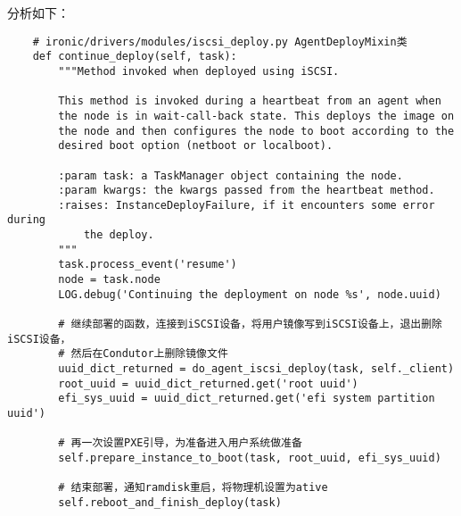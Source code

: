 \documentclass[a4paper,left=1.5cm,right=1.5cm,11pt]{article}
\begin{document}
	分析如下：
	\begin{lstlisting}
	# ironic/drivers/modules/iscsi_deploy.py AgentDeployMixin类
	def continue_deploy(self, task):
        """Method invoked when deployed using iSCSI.

        This method is invoked during a heartbeat from an agent when
        the node is in wait-call-back state. This deploys the image on
        the node and then configures the node to boot according to the
        desired boot option (netboot or localboot).

        :param task: a TaskManager object containing the node.
        :param kwargs: the kwargs passed from the heartbeat method.
        :raises: InstanceDeployFailure, if it encounters some error during
            the deploy.
        """
        task.process_event('resume')
        node = task.node
        LOG.debug('Continuing the deployment on node %s', node.uuid)

		# 继续部署的函数，连接到iSCSI设备，将用户镜像写到iSCSI设备上，退出删除iSCSI设备，
        # 然后在Condutor上删除镜像文件
        uuid_dict_returned = do_agent_iscsi_deploy(task, self._client)
        root_uuid = uuid_dict_returned.get('root uuid')
        efi_sys_uuid = uuid_dict_returned.get('efi system partition uuid')

		# 再一次设置PXE引导，为准备进入用户系统做准备
        self.prepare_instance_to_boot(task, root_uuid, efi_sys_uuid)

		# 结束部署，通知ramdisk重启，将物理机设置为ative
        self.reboot_and_finish_deploy(task)
	\end{lstlisting}
\end{document}
